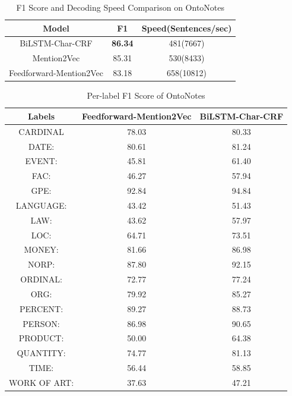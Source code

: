 \begin{table}[]
\centering
\caption{F1 Score and Decoding Speed Comparison on OntoNotes}
\label{table:ner-mention2vec2}
\begin{tabular}{|c|c|c|}
\hline
Model            & F1     & Speed(Sentences/sec) \\ \hline
BiLSTM-Char-CRF  & \textbf{86.34} & 481(7667)     \\ \hline
Mention2Vec      & 85.31 &   530(8433)          \\ \hline
Feedforward-Mention2Vec  & 83.18  &  658(10812)                   \\ \hline
\end{tabular}
\end{table}


\begin{table}[]
\centering
\caption{Per-label F1 Score of OntoNotes}
\label{table:ner-mention2vec3}
\begin{tabular}{|c|c|c|}
\hline
Labels           & Feedforward-Mention2Vec & BiLSTM-Char-CRF \\ \hline
         CARDINAL  & 78.03  & 80.33 \\ \hline
             DATE: & 80.61  & 81.24 \\ \hline
            EVENT: & 45.81  & 61.40 \\ \hline
              FAC: & 46.27  & 57.94 \\ \hline
              GPE: & 92.84  & 94.84 \\ \hline
         LANGUAGE: & 43.42  & 51.43 \\ \hline
              LAW: & 43.62  & 57.97 \\ \hline
              LOC: & 64.71  & 73.51 \\ \hline
            MONEY: & 81.66  & 86.98 \\ \hline
             NORP: & 87.80  & 92.15 \\ \hline
          ORDINAL: & 72.77  & 77.24 \\ \hline
              ORG: & 79.92  & 85.27 \\ \hline
          PERCENT: & 89.27  & 88.73 \\ \hline
           PERSON: & 86.98  & 90.65 \\ \hline
          PRODUCT: & 50.00  & 64.38 \\ \hline
         QUANTITY: & 74.77  & 81.13 \\ \hline
             TIME: & 56.44  & 58.85 \\ \hline
      WORK OF ART: & 37.63  & 47.21 \\ \hline
\end{tabular}
\end{table}


